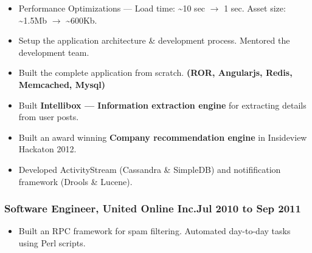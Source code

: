 \documentclass{resume}
\begin{document}
\begin{itemize} \itemsep1pt \parskip0pt
  \item Performance Optimizations --- Load time: \textasciitilde10 sec \( \rightarrow \) 1 sec.  
    Asset size: \textasciitilde1.5Mb \( \rightarrow \) \textasciitilde600Kb.
  \item Setup the application architecture \& development process. Mentored the development team.
\end{itemize}
\begin{itemize} \itemsep1pt \parskip0pt
  \item Built the complete application from scratch. \textbf{(ROR, Angularjs, Redis, Memcached, Mysql)}
  \item Built \textbf{Intellibox --- Information extraction engine} for extracting details from user posts.
\end{itemize}
\begin{itemize} \itemsep1pt \parskip0pt
  \item Built an award winning \textbf{Company recommendation engine} in Insideview Hackaton 2012.
  \item Developed ActivityStream (Cassandra \& SimpleDB) and notifification framework (Drools \& Lucene).
\end{itemize}
\subsubsection[Software Engineer, UOL]{Software Engineer, United Online Inc.\hfill Jul 2010 to Sep 2011}
\begin{itemize} \itemsep1pt \parskip0pt
  \item Built an RPC framework for spam filtering.  Automated day-to-day tasks using Perl scripts.
\end{itemize}
\end{document}
